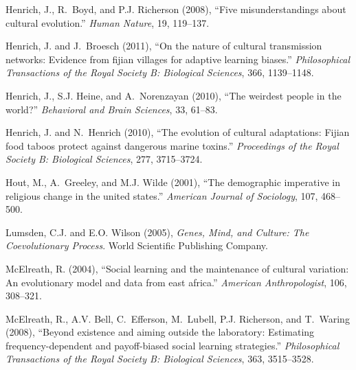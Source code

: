 \documentclass[11pt]{article}
\begin{document}
\begin{thebibliography}{32}
Henrich, J., R.~Boyd, and P.J. Richerson (2008), \enquote{Five
  misunderstandings about cultural evolution.} \emph{Human Nature}, 19,
  119--137.

Henrich, J. and J.~Broesch (2011), \enquote{On the nature of cultural
  transmission networks: Evidence from fijian villages for adaptive learning
  biases.} \emph{Philosophical Transactions of the Royal Society B: Biological
  Sciences}, 366, 1139--1148.

Henrich, J., S.J. Heine, and A.~Norenzayan (2010), \enquote{The weirdest people
  in the world?} \emph{Behavioral and Brain Sciences}, 33, 61--83.

Henrich, J. and N.~Henrich (2010), \enquote{The evolution of cultural
  adaptations: Fijian food taboos protect against dangerous marine toxins.}
  \emph{Proceedings of the Royal Society B: Biological Sciences}, 277,
  3715--3724.

Hout, M., A.~Greeley, and M.J. Wilde (2001), \enquote{The demographic
  imperative in religious change in the united states.} \emph{American Journal
  of Sociology}, 107, 468--500.

Lumsden, C.J. and E.O. Wilson (2005), \emph{Genes, Mind, and Culture: The
  Coevolutionary Process}. World Scientific Publishing Company.

McElreath, R. (2004), \enquote{Social learning and the maintenance of cultural
  variation: An evolutionary model and data from east africa.} \emph{American
  Anthropologist}, 106, 308--321.

McElreath, R., A.V. Bell, C.~Efferson, M.~Lubell, P.J. Richerson, and T.~Waring
  (2008), \enquote{Beyond existence and aiming outside the laboratory:
  Estimating frequency-dependent and payoff-biased social learning strategies.}
  \emph{Philosophical Transactions of the Royal Society B: Biological
  Sciences}, 363, 3515--3528.


\end{thebibliography}
\end{document}
